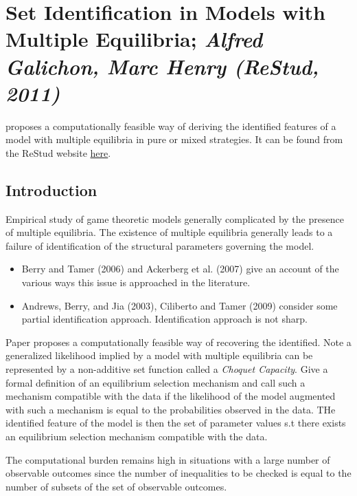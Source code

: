 
\newpage
\section{Set Identification in Models with Multiple Equilibria; \textit{\small Alfred Galichon, Marc Henry (ReStud, 2011)}}\label{sec:GH-2011}

\citet{GH-2011} proposes a computationally feasible way of deriving the identified features of a model with multiple equilibria in pure or mixed strategies. It can be found from the ReStud website \href{https://academic.oup.com/restud/article/78/4/1264/1593470}{here}.

\subsection{Introduction}

Empirical study of game theoretic models generally complicated by the presence of multiple equilibria. The existence of multiple equilibria generally leads to a failure of identification of the structural parameters governing the model.
\begin{itemize}
	\item Berry and Tamer (2006) and Ackerberg et al. (2007) give an account of the various ways this issue is approached in the literature.
	\item Andrews, Berry, and Jia (2003),  Ciliberto and Tamer (2009) consider some partial identification approach. Identification approach is not sharp.
\end{itemize}
Paper proposes a computationally feasible way of recovering the identified. Note a generalized likelihood implied by a model with multiple equilibria can be represented by a non-additive set function called a \textit{Choquet Capacity}.	Give a formal definition of an equilibrium selection mechanism and call such a mechanism compatible with the data if the likelihood of the model augmented with such a mechanism is equal to the probabilities observed in the data. THe identified feature of the model is then the set of parameter values s.t there exists an equilibrium selection mechanism compatible with the data.

The computational burden remains high in situations with a large number of observable outcomes since the number of inequalities to be checked is equal to the number of subsets of the set of observable outcomes.

